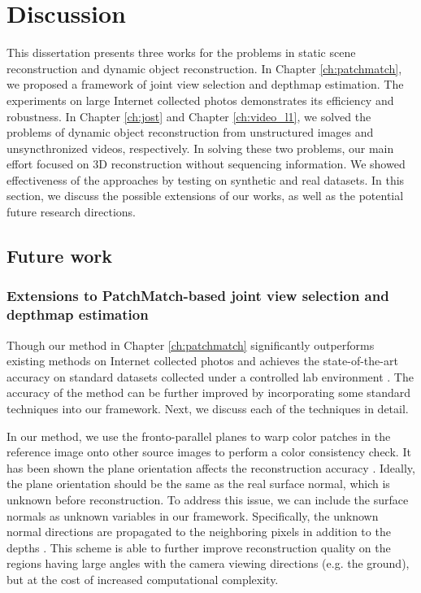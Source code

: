 \chapter{Discussion}
\label{ch:discussion}
This dissertation presents three works for the problems in static scene reconstruction and dynamic object reconstruction. In Chapter \ref{ch:patchmatch}, we proposed a framework of joint view selection and depthmap estimation. The experiments on large Internet collected photos demonstrates its efficiency and robustness. In Chapter \ref{ch:jost} and Chapter \ref{ch:video_l1}, we solved the problems of dynamic object reconstruction from unstructured images and unsyncthronized videos, respectively. In solving these two problems, our main effort focused on 3D reconstruction without sequencing information. We showed effectiveness of the approaches by testing on synthetic and real datasets. In this section, we discuss the possible extensions of our works, as well as the potential future research directions.

\section{Future work}

\subsection{Extensions to PatchMatch-based joint view selection and depthmap estimation}
\label{sec:patchmatch_extensions}

Though our method in Chapter \ref{ch:patchmatch} significantly outperforms existing methods on Internet collected photos \cite{Goesele07} and achieves the state-of-the-art accuracy on standard datasets collected under a controlled lab environment \cite{Strecha08}. The accuracy of the method can be further improved by incorporating some standard techniques into our framework. Next, we discuss each of the techniques in detail.

In our method, we use the fronto-parallel planes to warp color patches in the reference image onto other source images to perform a color consistency check. It has been shown the plane orientation affects the reconstruction accuracy \cite{Gallup07,FURUKAWA_PAMI2010}. Ideally, the plane orientation should be the same as the real surface normal, which is unknown before reconstruction. To address this issue, we can include the surface normals as unknown variables in our framework. Specifically, the unknown normal directions are propagated to the neighboring pixels in addition to the depths \cite{patchMatchStereo1}. This scheme is able to further improve reconstruction quality on the regions having large angles with the camera viewing directions (e.g. the ground), but at the cost of increased computational complexity.

